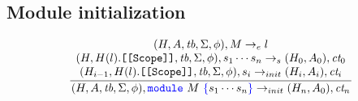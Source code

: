 \documentclass[a4paper]{article}
\newcommand{\code}[1]{\textcolor{blue}{\tt #1}}
\newcommand{\tb}{\emph{tb}}
\newcommand{\ct}{\emph{ct}}
\begin{document}
\subsection{Module initialization}

\begin{equation*}
\frac{
    \begin{array}{c}
    (H, A, \tb, \Sigma, \phi), M \rightarrow_e l \\
    (H, H(l).\texttt{[[Scope]]}, \tb, \Sigma, \phi), s_1 \cdots s_n \rightarrow_s (H_0, A_0), \ct_0 \\
    (H_{i-1}, H(l).\texttt{[[Scope]]}, \tb, \Sigma, \phi), s_i \rightarrow_{init} (H_i, A_i), \ct_i \\
    \end{array}
}{
    (H, A, \tb, \Sigma, \phi), \code{module}\ M\ \code{\{} s_1 \cdots s_n \code{\}} \rightarrow_{init} (H_n, A_0), \ct_n
}
\end{equation*}
\end{document}
